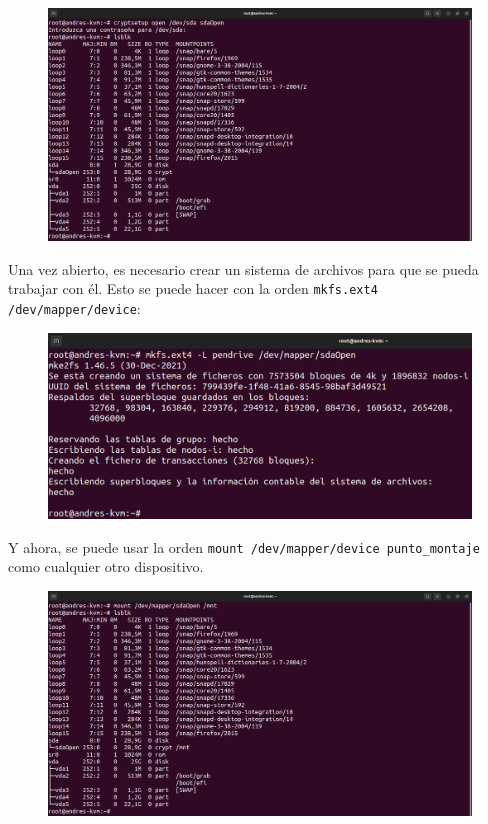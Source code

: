 \documentclass{article}
\begin{document}
\begin{figure}[H]
    \includegraphics[width=\textwidth]{imagenes/Captura desde 2022-10-30 10-54-01.png}
\end{figure}

\newpage

Una vez abierto, es necesario crear un sistema de archivos para que se pueda trabajar con él. Esto se puede hacer con la orden \verb|mkfs.ext4 /dev/mapper/device|:

\begin{figure}[H]
    \includegraphics[width=\textwidth]{imagenes/Captura desde 2022-10-30 10-57-11.png}
\end{figure}

\bigskip

Y ahora, se puede usar la orden \verb|mount /dev/mapper/device punto_montaje| como cualquier otro dispositivo.

\begin{figure}[H]
    \includegraphics[width=\textwidth]{imagenes/Captura desde 2022-10-30 10-58-23.png}
\end{figure}
\end{document}
